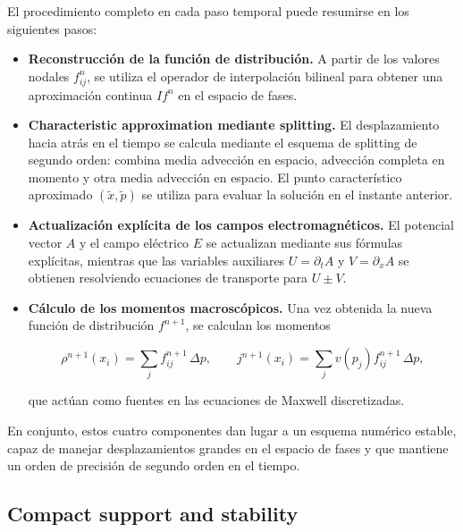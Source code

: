 \documentclass[11pt,a4paper,twoside,pdf]{article}
\numberwithin{equation}{section}
\begin{document}
El procedimiento completo en cada paso temporal puede resumirse en los siguientes pasos:

\begin{itemize}
\item \textbf{Reconstrucción de la función de distribución.}  
A partir de los valores nodales $f^n_{ij}$, se utiliza el operador de interpolación
bilineal para obtener una aproximación continua $I f^n$ en el espacio de fases.


\item \textbf{Characteristic approximation mediante splitting.}  
El desplazamiento hacia atrás en el tiempo se calcula mediante el esquema de
splitting de segundo orden: combina media advección en espacio, advección
completa en momento y otra media advección en espacio.  
El punto característico aproximado $(\tilde{x},\tilde{p})$ se utiliza para evaluar la solución en el instante anterior.

\item \textbf{Actualización explícita de los campos electromagnéticos.}  
El potencial vector $A$ y el campo eléctrico $E$ se actualizan mediante sus fórmulas
explícitas, mientras que las variables auxiliares $U=\partial_t A$ y
$V=\partial_x A$ se obtienen resolviendo ecuaciones de transporte para
$U\pm V$.  


\item \textbf{Cálculo de los momentos macroscópicos.}  
Una vez obtenida la nueva función de distribución $f^{n+1}$, se calculan los
momentos


\[
\rho^{n+1}(x_i)=\sum_j f^{n+1}_{ij}\,\Delta p, \qquad
j^{n+1}(x_i)=\sum_j v(p_j)f^{n+1}_{ij}\,\Delta p,
\]


que actúan como fuentes en las ecuaciones de Maxwell discretizadas.
\end{itemize}

\medskip

En conjunto, estos cuatro componentes dan lugar a un esquema numérico estable,
capaz de manejar desplazamientos grandes en el espacio de fases y que mantiene un
orden de precisión de segundo orden en el tiempo.








\subsection{Compact support and stability}
\end{document}
